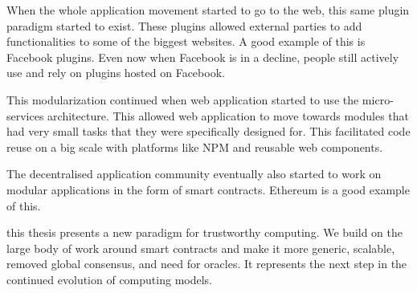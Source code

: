 \documentclass[a4paper]{article}
\begin{document}
When the whole application movement started to go to the web, this same plugin paradigm started to exist. These plugins allowed external parties to add functionalities to some of the biggest websites. A good example of this is Facebook plugins. Even now when Facebook is in a decline, people still actively use and rely on plugins hosted on Facebook.

This modularization continued when web application started to use the micro-services architecture. This allowed web application to move towards modules that had very small tasks that they were specifically designed for. This facilitated code reuse on a big scale with platforms like NPM and reusable web components.

The decentralised application community eventually also started to work on modular applications in the form of smart contracts. Ethereum is a good example of this.

this thesis presents a new paradigm for trustworthy computing. We build on the large body of work around smart contracts and make it more generic, scalable, removed global consensus, and need for oracles. It represents the next step in the continued evolution of computing models.
\end{document}

